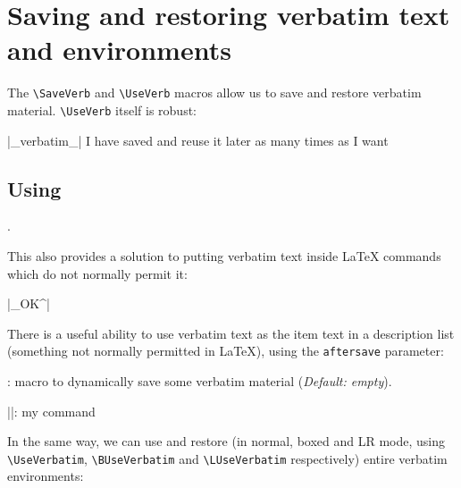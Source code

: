 \documentclass[twoside]{article}
\newcommand\cs[1]{\texttt{\textbackslash#1}}
\providecommand\optname[1]{\textsf{#1}}
\newenvironment{optlist}{\begin{description}%
  \renewcommand\makelabel[1]{%
    \descriptionlabel{\mdseries\optname{##1}}}%
  \itemsep0.25\itemsep}%
 {\end{description}}
\begin{document}
\section{Saving and restoring verbatim text and environments}

  The \cs{SaveVerb} and \cs{UseVerb} macros allow us to save and restore
verbatim material. \cs{UseVerb} itself is robust:

\begin{SideBySideExample}
  \DefineShortVerb{\|}
  |_verbatim_|
  I have saved  and reuse 
  it later as many times as I want
  \subsection*{Using }
  .
\end{SideBySideExample}

  This also provides a solution to putting verbatim text inside \LaTeX{}
commands which do not normally permit it: %

{
\begin{Example}
  \DefineShortVerb{\|}|_OK^| 
\end{Example}
}

  There is a useful ability to use verbatim text as the item text in a
description list (something not normally permitted in \LaTeX), using the
\texttt{aftersave} parameter:

\begin{optlist}
  \item[aftersave (macro)]: macro to dynamically save some verbatim material
  (\emph{Default: empty}).
\end{optlist}

\begin{SideBySideExample}
  \newcommand{\Vitem}{%
    }
  \DefineShortVerb{\|}
  \begin{description}
    \Vitem|\MyCommand|: my command
  \end{description}
\end{SideBySideExample}

  In the same way, we can use and restore (in normal, boxed and LR mode,
using \cs{UseVerbatim}, \cs{BUseVerbatim} and \cs{LUseVerbatim} respectively)
entire verbatim environments:
\end{document}
